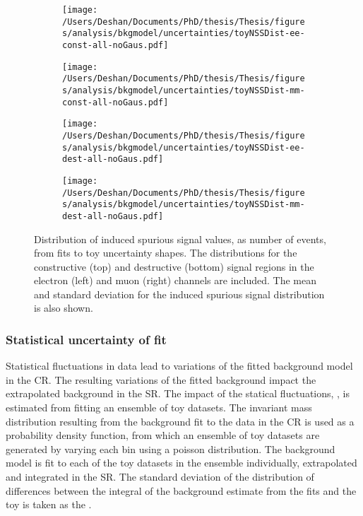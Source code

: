 \begin{figure}[h!]
    \centering
    \begin{subfigure}[b]{0.49\textwidth}
        \centering
        \texttt{[image: /Users/Deshan/Documents/PhD/thesis/Thesis/figures/analysis/bkgmodel/uncertainties/toyNSSDist-ee-const-all-noGaus.pdf]}
        \label{fig:bkgmodel:issu1}
    \end{subfigure}
    \begin{subfigure}[b]{0.49\textwidth}
        \centering
        \texttt{[image: /Users/Deshan/Documents/PhD/thesis/Thesis/figures/analysis/bkgmodel/uncertainties/toyNSSDist-mm-const-all-noGaus.pdf]}
        \label{fig:bkgmodel:issu2}
    \end{subfigure}
    \begin{subfigure}[b]{0.49\textwidth}
        \centering
        \texttt{[image: /Users/Deshan/Documents/PhD/thesis/Thesis/figures/analysis/bkgmodel/uncertainties/toyNSSDist-ee-dest-all-noGaus.pdf]}
        \label{fig:bkgmodel:issu3}
    \end{subfigure}
    \begin{subfigure}[b]{0.49\textwidth}
        \centering
        \texttt{[image: /Users/Deshan/Documents/PhD/thesis/Thesis/figures/analysis/bkgmodel/uncertainties/toyNSSDist-mm-dest-all-noGaus.pdf]}
        \label{fig:bkgmodel:issu4}
    \end{subfigure}
    \caption[Induced spurious signal distributions from fits to toy uncertainties.]{Distribution of induced spurious signal values, as number of events, from fits to toy uncertainty shapes. The distributions for the constructive (top) and destructive (bottom) signal regions in the electron (left) and muon (right) channels are included. The mean and standard deviation for the induced spurious signal distribution is also shown.}
    \label{fig:bkgmodel:issu}
\end{figure}

\subsubsection{Statistical uncertainty of fit}\label{sec:extrap:ststu}
Statistical fluctuations in data lead to variations of the fitted background model in the CR. The resulting variations of the fitted background impact the extrapolated background in the SR. The impact of the statical fluctuations, \STATU, is estimated from fitting an ensemble of toy datasets. The invariant mass distribution resulting from the background fit to the data in the CR is used as a probability density function, from which an ensemble of toy datasets are generated by varying each bin using a poisson distribution. The background model is fit to each of the toy datasets in the ensemble individually, extrapolated and integrated in the SR. The standard deviation of the distribution of differences between the integral of the background estimate from the fits and the toy is taken as the \STATU. 

